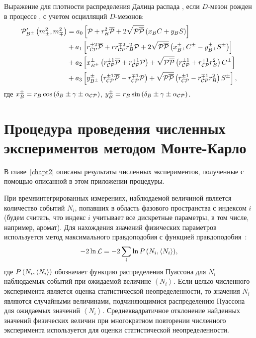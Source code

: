 Выражение для плотности распределения Далица распада \dkpp, если $D$-мезон рожден в процессе \bdk, с учетом осцилляций $D$-мезонов:
\begin{equation}\label{eq:pBMixCP}
  \begin{split}
   \mathcal{P}^{\prime}_{B^{\pm}}\left(m_{\pm}^2,m_{\mp}^2\right)&=
     a_0\left [\mathcal{P}+r_B^2\overline{\mathcal{P}}+2\sqrt{\mathcal{P}\overline{\mathcal{P}}}\left( x_BC+y_BS\right)\right ]\\
   &+a_1\left [r_{\mathcal{CP}}^{\pm 2}\overline{\mathcal{P}}+rr_{\mathcal{CP}}^{\mp 2}r_B^2\mathcal{P} + 
     2\sqrt{\mathcal{P}\overline{\mathcal{P}}}\left( x_{B^{\pm}}^{\pm}C^{\pm}-
                             y_{B^{\pm}}^{\pm}S^{\pm}\right)\right ]\\
   &+a_2\left [x_{B^{\pm}}^{\pm}\left( r_{\mathcal{CP}}^{\pm 1}\overline{\mathcal{P}}+r_{\mathcal{CP}}^{\mp 1}\mathcal{P}\right)+
     \sqrt{\mathcal{P}\overline{\mathcal{P}}}\left( r_{\mathcal{CP}}^{\pm 1}+
                            r_{\mathcal{CP}}^{\mp 1}r_B^2\right) C^{\pm}\right ]\\
   &+a_3\left [y_{B^{\pm}}^{\pm}\left( r_{\mathcal{CP}}^{\pm 1}\overline{\mathcal{P}}-r_{\mathcal{CP}}^{\mp 1}\mathcal{P}\right)+
     \sqrt{\mathcal{P}\overline{\mathcal{P}}}\left( r_{\mathcal{CP}}^{\pm 1}-
                            r_{\mathcal{CP}}^{\mp 1}r_B^2\right) S^{\pm}\right ],
  \end{split}
 \end{equation}
где $x_B^{\pm}=r_B\cos{\lbr \delta_B\pm\gphi\pm\alcp\rbr}$, 
    $y_B^{\pm}=r_B\sin{\lbr \delta_B\pm\gphi\pm\alcp\rbr}$.

\chapter{Процедура проведения численных экспериментов методом Монте-Карло} \label{app:toy-mc}
В главе~\ref{chapt2} описаны результаты численных экспериментов, полученные с помощью описанной в этом приложении процедуры. 

При времяинтегрированных измерениях, наблюдаемой величиной является количество событий $N_i$, попавших в область фазового пространства с индексом $i$ (будем считать, что индекс $i$ учитывает все дискретные параметры, в том числе, например, аромат).  Для нахождения значений физических параметров используется метод максимального правдоподобия с функцией правдоподобия~\mcl:
\begin{equation}
 -2\ln\mathcal{L} = -2\sum\limits_i{\ln P\left( N_i, \left< N_i\right> \right)},
\end{equation}
где $P\left( N_i, \left< N_i\right> \right)$ обозначает функцию распределения Пуассона для $N_i$ наблюдаемых событий при ожидаемой величине $\left< N_i\right>$.  Если целью численного эксперимента является оценка статистической неопределенности, то значения $N_i$ являются случайными величинами, подчиняющимися распределению Пуассона для ожидаемых значений $\left< N_i\right>$.  Среднеквадратичное отклонение найденных значений физических величин при многократном повторении численного эксперимента используется для оценки статистической неопределенности.

